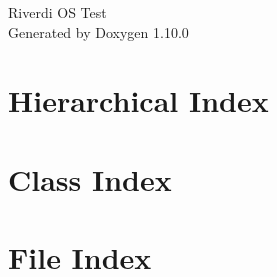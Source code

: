 \documentclass[twoside]{book}
\newcommand{\+}{\discretionary{\mbox{\scriptsize$\hookleftarrow$}}{}{}}
\newcommand{\clearemptydoublepage}{%
    \newpage{\pagestyle{empty}\cleardoublepage}%
  }
\begin{document}
  \raggedbottom
    \hypersetup{pageanchor=false,
                bookmarksnumbered=true,
                pdfencoding=unicode
               }
  \begin{titlepage}
  \vspace*{7cm}
  \begin{center}%
  {\Large Riverdi OS Test}\\
  \vspace*{1cm}
  {\large Generated by Doxygen 1.10.0}\\
  \end{center}
  \end{titlepage}
  \clearemptydoublepage
  \tableofcontents
  \clearemptydoublepage
  \hypersetup{pageanchor=true}

\chapter{Hierarchical Index}

\chapter{Class Index}

\chapter{File Index}

\end{document}
